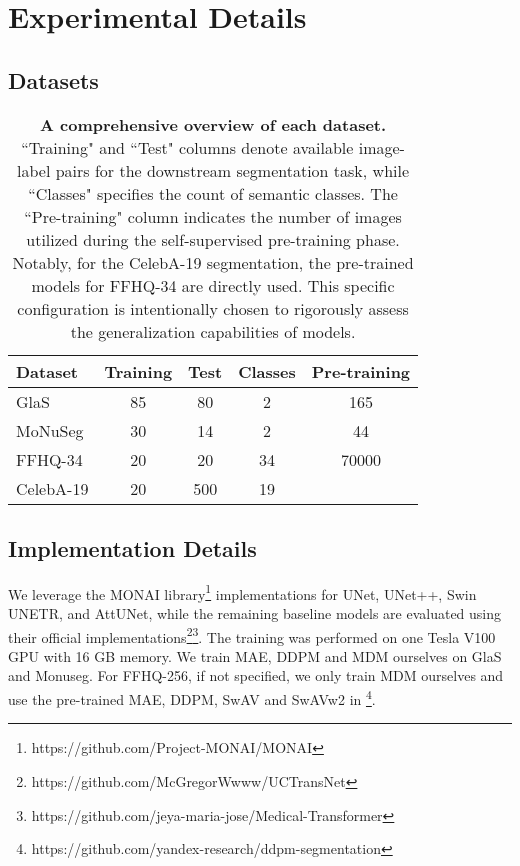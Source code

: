 \documentclass{article} \usepackage{iclr2024_conference,times}
\begin{document}



\appendix
\section{Experimental Details} 

\subsection{Datasets} 
\label{dataset}
\begin{table}[!htbp]
    \centering
    \caption{\textbf{A comprehensive overview of each dataset.} ``Training" and ``Test" columns denote available image-label pairs for the downstream segmentation task, while ``Classes" specifies the count of semantic classes. The ``Pre-training" column indicates the number of images utilized during the self-supervised pre-training phase. Notably, for the CelebA-19 segmentation, the pre-trained models for FFHQ-34 are directly used. This specific configuration is intentionally chosen to rigorously assess the generalization capabilities of models.}
    \small \begin{tabular}{lcccc}
        \toprule
         Dataset &Training &Test &Classes &Pre-training\\
        \midrule
        GlaS &85 &80 &2 &165\\
        MoNuSeg &30 &14 &2 &44\\
        FFHQ-34  &20 &20 &34 &70000\\
        CelebA-19 &20 &500 &19 &\text{-}\\
        \bottomrule
    \end{tabular}
    \label{Dataset}
\end{table}


\subsection{Implementation Details}
\label{implementation}
We leverage the MONAI library\footnote{https://github.com/Project-MONAI/MONAI} \citep{cardoso2022monai} implementations for UNet, UNet++, Swin UNETR, and AttUNet, while the remaining baseline models are evaluated using their official implementations\footnote{https://github.com/McGregorWwww/UCTransNet}\footnote{https://github.com/jeya-maria-jose/Medical-Transformer}. The training was performed on one Tesla V100 GPU with 16 GB memory. We train MAE, DDPM and MDM ourselves on GlaS and Monuseg. For FFHQ-256, if not specified, we only train MDM ourselves and use the pre-trained MAE, DDPM, SwAV and SwAVw2 in \citet{DBLP:conf/iclr/BaranchukVRKB22}\footnote{https://github.com/yandex-research/ddpm-segmentation}. 
\end{document}
